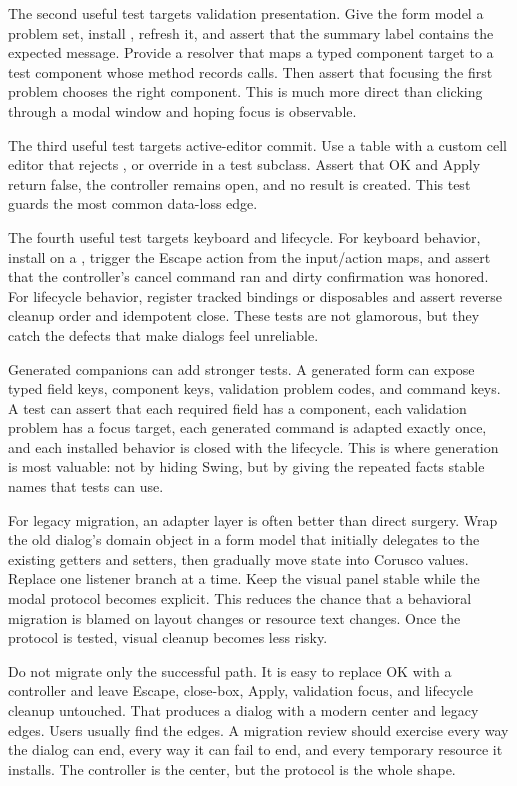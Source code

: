 The second useful test targets validation presentation. Give the form model a
problem set, install , refresh it, and assert
that the summary label contains the expected message. Provide a resolver that
maps a typed component target to a test component whose 
method records calls. Then assert that focusing the first problem chooses the
right component. This is much more direct than clicking through a modal window
and hoping focus is observable.

The third useful test targets active-editor commit. Use a table with a custom
cell editor that rejects , or override
 in a test subclass. Assert that OK and Apply return
false, the controller remains open, and no result is created. This test guards
the most common data-loss edge.

The fourth useful test targets keyboard and lifecycle. For keyboard behavior,
install  on a , trigger the
Escape action from the input/action maps, and assert that the controller's
cancel command ran and dirty confirmation was honored. For lifecycle behavior,
register tracked bindings or disposables and assert reverse cleanup order and
idempotent close. These tests are not glamorous, but they catch the defects
that make dialogs feel unreliable.

Generated companions can add stronger tests. A generated form can expose typed
field keys, component keys, validation problem codes, and command keys. A test
can assert that each required field has a component, each validation problem
has a focus target, each generated command is adapted exactly once, and each
installed behavior is closed with the lifecycle. This is where generation is
most valuable: not by hiding Swing, but by giving the repeated facts stable
names that tests can use.

For legacy migration, an adapter layer is often better than direct surgery.
Wrap the old dialog's domain object in a form model that initially delegates to
the existing getters and setters, then gradually move state into Corusco
values. Replace one listener branch at a time. Keep the visual panel stable
while the modal protocol becomes explicit. This reduces the chance that a
behavioral migration is blamed on layout changes or resource text changes. Once
the protocol is tested, visual cleanup becomes less risky.

Do not migrate only the successful path. It is easy to replace OK with a
controller and leave Escape, close-box, Apply, validation focus, and lifecycle
cleanup untouched. That produces a dialog with a modern center and legacy
edges. Users usually find the edges. A migration review should exercise every
way the dialog can end, every way it can fail to end, and every temporary
resource it installs. The controller is the center, but the protocol is the
whole shape.

